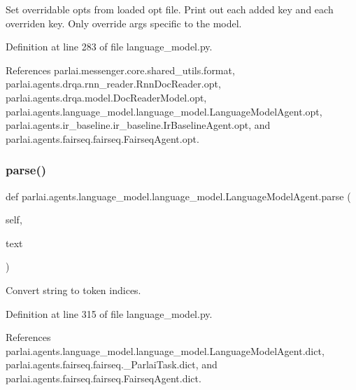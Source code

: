 \begin{DoxyVerb}Set overridable opts from loaded opt file.
Print out each added key and each overriden key.
Only override args specific to the model.
\end{DoxyVerb}
 

Definition at line 283 of file language\+\_\+model.\+py.



References parlai.\+messenger.\+core.\+shared\+\_\+utils.\+format, parlai.\+agents.\+drqa.\+rnn\+\_\+reader.\+Rnn\+Doc\+Reader.\+opt, parlai.\+agents.\+drqa.\+model.\+Doc\+Reader\+Model.\+opt, parlai.\+agents.\+language\+\_\+model.\+language\+\_\+model.\+Language\+Model\+Agent.\+opt, parlai.\+agents.\+ir\+\_\+baseline.\+ir\+\_\+baseline.\+Ir\+Baseline\+Agent.\+opt, and parlai.\+agents.\+fairseq.\+fairseq.\+Fairseq\+Agent.\+opt.

\mbox{\label{classparlai_1_1agents_1_1language__model_1_1language__model_1_1LanguageModelAgent_ad67bbe760648032c08da9400bb2e3da1}} 
\subsubsection{\texorpdfstring{parse()}{parse()}}
{\footnotesize\ttfamily def parlai.\+agents.\+language\+\_\+model.\+language\+\_\+model.\+Language\+Model\+Agent.\+parse (\begin{DoxyParamCaption}\item[{}]{self,  }\item[{}]{text }\end{DoxyParamCaption})}

\begin{DoxyVerb}Convert string to token indices.\end{DoxyVerb}
 

Definition at line 315 of file language\+\_\+model.\+py.



References parlai.\+agents.\+language\+\_\+model.\+language\+\_\+model.\+Language\+Model\+Agent.\+dict, parlai.\+agents.\+fairseq.\+fairseq.\+\_\+\+Parlai\+Task.\+dict, and parlai.\+agents.\+fairseq.\+fairseq.\+Fairseq\+Agent.\+dict.



